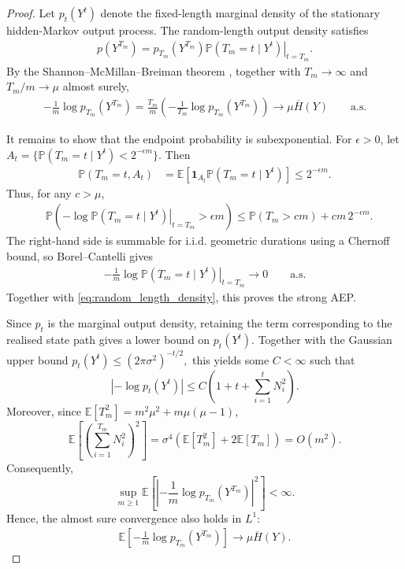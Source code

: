 \documentclass[onecolumn]{IEEEtran}
\theoremstyle{definition}
\begin{document}
\begin{proof}
{
Let $p_t(Y^t)$ denote the fixed-length marginal density of the stationary hidden-Markov
output process. The random-length output density satisfies
\begin{align}
p(Y^{T_m})
=
p_{T_m}(Y^{T_m})
\left.\mathbb{P}(T_m=t\mid Y^t)\right|_{t=T_m}.
\label{eq:random_length_density}
\end{align}
}
By the Shannon--McMillan--Breiman theorem \cite{CoverThomas}, together with
$T_m\to\infty$ and $T_m/m\to\mu$ almost surely, \cite[Theorem 8.1]{Gut2009}
\begin{align*}
-\frac{1}{m}\log p_{T_m}(Y^{T_m})=
\frac{T_m}{m}
\left(
-\frac{1}{T_m}\log p_{T_m}(Y^{T_m})
\right)
\to\mu\overline H(Y)
\qquad\text{a.s.}
\end{align*}

{
It remains to show that the endpoint probability is subexponential. For
$\epsilon>0$, let $A_t=\{\mathbb{P}(T_m=t\mid Y^t)<2^{-\epsilon m}\}.$
Then
\begin{align*}
\mathbb{P}(T_m=t,A_t)
&=\mathbb E[
\mathbf 1_{A_t}\mathbb{P}(T_m=t\mid Y^t)]
\le2^{-\epsilon m}.
\end{align*}
Thus, for any $c>\mu$,
\begin{align*}
&\mathbb{P}\!\left(
-\left.\log \mathbb{P}(T_m=t\mid Y^t)\right|_{t=T_m}>\epsilon m
\right)\le
\mathbb{P}(T_m>cm)+cm\,2^{-\epsilon m}.
\end{align*}
The right-hand side is summable for i.i.d. geometric durations using a Chernoff bound, so
Borel--Cantelli gives
\begin{align*}
-\frac{1}{m}
\left.\log \mathbb{P}(T_m=t\mid Y^t)\right|_{t=T_m}
\to0
\qquad\text{a.s.}
\end{align*}
Together with \eqref{eq:random_length_density}, this proves the strong AEP. 

Since \(p_t\) is the marginal output density, retaining the term
corresponding to the realised state path gives a lower bound on \(p_t(Y^t)\).
Together with the Gaussian upper bound $p_t(Y^t)\leq (2\pi\sigma^2)^{-t/2},$ this yields some \(C<\infty\) such that
\[
\left|-\log p_t(Y^t)\right|
\leq
C\left(1+t+\sum_{i=1}^{t}N_i^2\right).
\]
Moreover, since
\(\mathbb E[T_m^2]=
m^2\mu^2+m\mu(\mu-1)\),
\[
\mathbb E\!\left[
\left(\sum_{i=1}^{T_m}N_i^2\right)^2
\right]
=
\sigma^4\left(\mathbb E[T_m^2]+2\mathbb E[T_m]\right)
=
O(m^2).
\]
Consequently,
\[
\sup_{m\geq1}
\mathbb E\!\left[
\left|
-\frac{1}{m}\log p_{T_m}(Y^{T_m})
\right|^2
\right]
<\infty.
\]
Hence, the almost sure convergence also holds in \(L^1\):
\begin{align*}
\mathbb E\!\left[
-\frac{1}{m}\log p_{T_m}(Y^{T_m})
\right]
\to \mu\overline H(Y).
\end{align*}

}
\end{proof}
\end{document}
